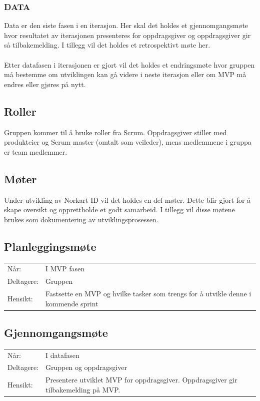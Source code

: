 \subsubsection*{DATA}
Data er den siste fasen i en iterasjon. Her skal det holdes et gjennomgangsmøte hvor resultatet av iterasjonen presenteres for oppdragsgiver og oppdragsgiver gir så tilbakemelding. I tillegg vil det holdes et retrospektivt møte her. 
\\
\\
Etter datafasen i iterasjonen er gjort vil det holdes et endringsmøte hvor gruppen må bestemme om utviklingen kan gå videre i neste iterasjon eller om MVP må endres eller gjøres på nytt.

\subsection{Roller}
\label{app:arbeidsmetode_arbeidsmetodikk_roller}
Gruppen kommer til å bruke roller fra Scrum. Oppdragsgiver stiller med produkteier og Scrum master (omtalt som veileder), mens medlemmene i gruppa er team medlemmer.


\subsection{Møter}
\label{app:arbeidsmetode_arbeidsmetodikk_møter}
Under utvikling av Norkart ID vil det holdes en del møter. Dette blir gjort for å skape oversikt og opprettholde et godt samarbeid. I tillegg vil disse møtene brukes som dokumentering av utviklingsprosessen.

\subsection*{Planleggingsmøte}
\bigskip{}
\begin{tabular}{l p{11cm}}
    Når: & I MVP fasen \\
    Deltagere: & Gruppen \\
    Hensikt: & Fastsette en MVP og hvilke tasker som trengs for å utvikle denne i kommende sprint
\end{tabular}

\subsection*{Gjennomgangsmøte}
\bigskip{}
\begin{tabular}{l p{11cm}}
    Når: & I datafasen \\
    Deltagere: & Gruppen og oppdragsgiver \\
    Hensikt: & Presentere utviklet MVP for oppdragsgiver. Oppdragsgiver gir tilbakemelding på MVP.
\end{tabular}

